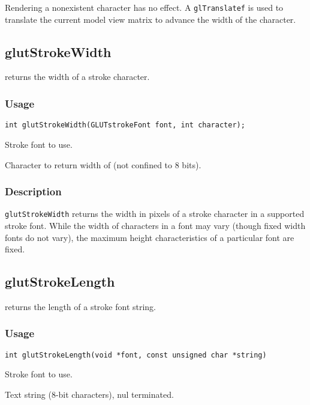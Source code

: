 Rendering a nonexistent character has no effect.  A {\tt glTranslatef} is used
to translate the current model view matrix to advance the width of the
character.

\subsection{glutStrokeWidth}

 returns the width of a stroke character.

\subsubsection*{Usage}
\begin{verbatim}
int glutStrokeWidth(GLUTstrokeFont font, int character);
\end{verbatim}
\begin{description}
\itemsep 0in
\item[{\tt font}]
Stroke font to use.
\item[{\tt character}]
Character to return width of (not confined to 8 bits).
\end{description}

\subsubsection*{Description}

{\tt glutStrokeWidth} returns the width in pixels of a stroke character
in a supported stroke font.  While the width of characters in a font
may vary (though fixed width fonts do not vary), the maximum height
characteristics of a particular font are fixed.

\subsection{glutStrokeLength}

 returns the length of a stroke font string.

\subsubsection*{Usage}
\begin{verbatim}
int glutStrokeLength(void *font, const unsigned char *string)
\end{verbatim}
\begin{description}
\itemsep 0in
\item[{\tt font}]
Stroke font to use.
\item[{\tt string}]
Text string (8-bit characters), nul terminated.
\end{description}

